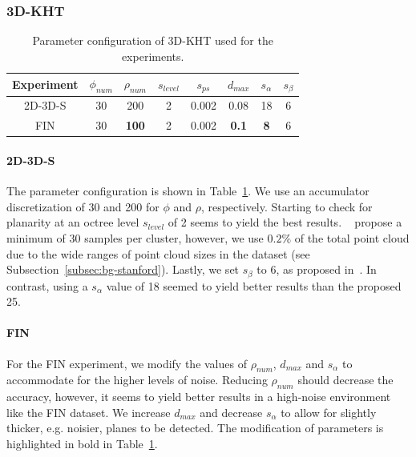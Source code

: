 \documentclass[main.tex]{subfiles}
\begin{document}
\subsubsection{3D-KHT}
\begin{table}[H]
    \centering
    \begin{tabular}{c|ccccccc}
        Experiment & $\phi_{num}$ & $\rho_{num}$ & $s_{level}$ & $s_{ps}$ & $d_{max}$    & $s_\alpha$ & $s_\beta$ \\ \hline
        2D-3D-S    & 30           & 200          & 2           & 0.002    & 0.08         & 18         & 6         \\
        FIN        & 30           & \textbf{100} & 2           & 0.002    & \textbf{0.1} & \textbf{8} & 6
    \end{tabular}%
    \caption{Parameter configuration of 3D-KHT used for the experiments.}
    \label{tab:3dkht-param}
\end{table}

\paragraph{2D-3D-S}
The parameter configuration is shown in Table~\ref{tab:3dkht-param}. We use an accumulator discretization of 30 and 200 for $\phi$ and $\rho$, respectively.
Starting to check for planarity at an octree level $s_{level}$ of 2 seems to yield the best results.
\citeauthor{Limberger_Oliveira_2015}~\cite{Limberger_Oliveira_2015} propose
a minimum of 30 samples per cluster, however, we use $0.2\%$ of the total point cloud due to the wide ranges of point cloud sizes in the dataset (see Subsection~\ref{subsec:bg-stanford}).
Lastly, we set $s_\beta$ to 6, as proposed in~\cite[Section~3.1]{Limberger_Oliveira_2015}. In contrast, using a $s_\alpha$ value of 18 seemed to yield better results than the proposed 25.

\paragraph{FIN}
For the FIN experiment, we modify the values of $\rho_{num}$, $d_{max}$ and $s_\alpha$ to accommodate for the higher levels of noise.
Reducing $\rho_{num}$ should decrease the accuracy, however, it seems to yield better results in a high-noise environment like the FIN dataset.
We increase $d_{max}$ and decrease $s_\alpha$ to allow for slightly thicker, e.g. noisier, planes to be detected.
The modification of parameters is highlighted in bold in Table~\ref{tab:3dkht-param}.
\end{document}
